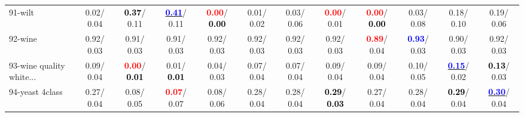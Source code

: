 \begin{table}[h]
\begin{center}
{\begin{tabular}{lc|c|c|c|c|c|c|c|c|c|c}
91-wilt &   0.02/  0.04 & \textcolor{black}{\textbf{  0.37}}/  0.11 & \underline{\textcolor{blue}{\textbf{  0.41}}}/  0.11 & \textcolor{red}{\textbf{  0.00}}/\textcolor{black}{\textbf{  0.00}} &   0.01/  0.02 &   0.03/  0.06 & \textcolor{red}{\textbf{  0.00}}/  0.01 & \textcolor{red}{\textbf{  0.00}}/\textcolor{black}{\textbf{  0.00}} &   0.03/  0.08 &   0.18/  0.10 &   0.19/  0.06 \\
92-wine &   0.92/  0.03 &   0.91/  0.03 &   0.91/  0.03 &   0.92/  0.03 &   0.92/  0.03 &   0.92/  0.03 &   0.92/  0.03 & \textcolor{red}{\textbf{  0.89}}/  0.04 & \textcolor{blue}{\textbf{  0.93}}/  0.03 &   0.90/  0.03 &   0.92/  0.03 \\ \hline
93-wine quality white... &   0.09/  0.04 & \textcolor{red}{\textbf{  0.00}}/\textcolor{black}{\textbf{  0.01}} &   0.01/\textcolor{black}{\textbf{  0.01}} &   0.04/  0.03 &   0.07/  0.04 &   0.07/  0.04 &   0.09/  0.04 &   0.09/  0.04 &   0.10/  0.05 & \underline{\textcolor{blue}{\textbf{  0.15}}}/  0.02 & \textcolor{black}{\textbf{  0.13}}/  0.03 \\
94-yeast 4class &   0.27/  0.04 &   0.08/  0.05 & \textcolor{red}{\textbf{  0.07}}/  0.07 &   0.08/  0.06 &   0.28/  0.04 &   0.28/  0.04 & \textcolor{black}{\textbf{  0.29}}/\textcolor{black}{\textbf{  0.03}} &   0.27/  0.04 &   0.28/  0.04 & \textcolor{black}{\textbf{  0.29}}/  0.04 & \underline{\textcolor{blue}{\textbf{  0.30}}}/  0.04 \\\end{tabular}
}\label{strats2bNB}
\end{center}
\end{table}